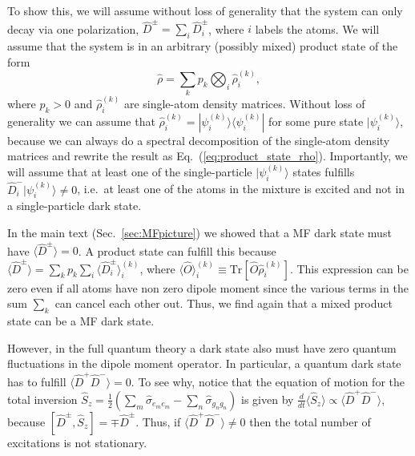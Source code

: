 \documentclass[aps,prx,superscriptaddress,twocolumn,notitlepage,nofootinbib,longbibliography]{revtex4-2}
\newcommand{\Tr}{\mathrm{Tr}}
\begin{document}
To show this, we will assume without loss of generality that the system can only decay via one polarization, $\hat{D}^\pm = \sum_i \hat{D}^\pm_i$, where $i$ labels the atoms.
We will assume that the system is in an arbitrary (possibly mixed) product state of the form
\begin{equation}
    \hat{\rho} = \sum_k p_k \bigotimes_i \hat{\rho}^{(k)}_i ,
\label{eq:product_state_rho}
\end{equation}
where $p_k>0$ and $\hat{\rho}^{(k)}_i$ are single-atom density matrices. Without loss of generality we can assume that $\hat{\rho}^{(k)}_i = | \psi^{(k)}_i \rangle \langle \psi^{(k)}_i |$ for some pure state $| \psi^{(k)}_i \rangle$, because we can always do a spectral decomposition of the single-atom density matrices and rewrite the result as Eq.~(\ref{eq:product_state_rho}). Importantly, we will assume that at least one of the single-particle $| \psi^{(k)}_i \rangle$ states fulfills $\hat{D}^-_i| \psi^{(k)}_i \rangle\neq0$, i.e.~at least one of the atoms in the mixture is excited and not in a single-particle dark state.

In the main text (Sec.~\ref{sec:MFpicture}) we showed that a MF dark state must have $\langle \hat{D}^\pm \rangle=0$. A product state can fulfill this because $\langle \hat{D}^\pm \rangle = \sum_k p_k \sum_i \langle \hat{D}^\pm_i \rangle_i^{(k)}$, where $\langle \hat{O} \rangle_i^{(k)} \equiv \Tr[ \hat{O} \hat{\rho}^{(k)}_i ]$. This expression can be  zero even if all atoms have non zero dipole moment since  the various  terms in the sum $\sum_k$  can cancel each other  out. Thus, we find again that a mixed product state can be a MF dark state.

However, in the full quantum theory a dark state also must have zero quantum fluctuations in the dipole moment operator. In particular, a quantum dark state has to fulfill $\langle \hat{D}^+\hat{D}^- \rangle = 0$. To see why, notice that the equation of motion for the total inversion $\hat{S}_z = \frac{1}{2} ( \sum_m \hat{\sigma}_{e_me_m} - \sum_n \hat{\sigma}_{g_ng_n} )$ is given by $\frac{d}{dt} \langle \hat{S}_z \rangle \propto \langle \hat{D}^+ \hat{D}^- \rangle$, because $[\hat{D}^\pm, \hat{S}_z] = \mp \hat{D}^\pm$. Thus, if $\langle \hat{D}^+\hat{D}^- \rangle \neq 0$ then the total number of excitations is not stationary.
\end{document}
